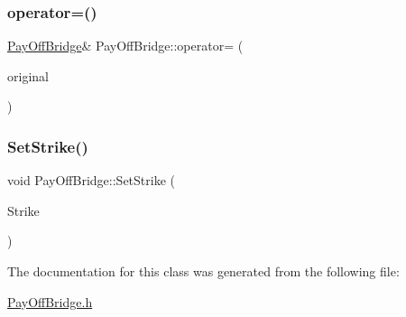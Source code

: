\hypertarget{classPayOffBridge_a385d8efcf0fe071fd5718c010321c4f1}{}\label{classPayOffBridge_a385d8efcf0fe071fd5718c010321c4f1} 
\subsubsection{\texorpdfstring{operator=()}{operator=()}}
{\footnotesize\ttfamily \hyperlink{classPayOffBridge}{Pay\+Off\+Bridge}\& Pay\+Off\+Bridge\+::operator= (\begin{DoxyParamCaption}\item[{const \hyperlink{classPayOffBridge}{Pay\+Off\+Bridge} \&}]{original }\end{DoxyParamCaption})}

\hypertarget{classPayOffBridge_a7e2924916dd98511d8ec0549a80201b4}{}\label{classPayOffBridge_a7e2924916dd98511d8ec0549a80201b4} 
\subsubsection{\texorpdfstring{Set\+Strike()}{SetStrike()}}
{\footnotesize\ttfamily void Pay\+Off\+Bridge\+::\+Set\+Strike (\begin{DoxyParamCaption}\item[{double}]{Strike }\end{DoxyParamCaption})\hspace{0.3cm}{\ttfamily [inline]}}



The documentation for this class was generated from the following file\+:\begin{DoxyCompactItemize}
\item 
\hyperlink{PayOffBridge_8h}{Pay\+Off\+Bridge.\+h}\end{DoxyCompactItemize}
